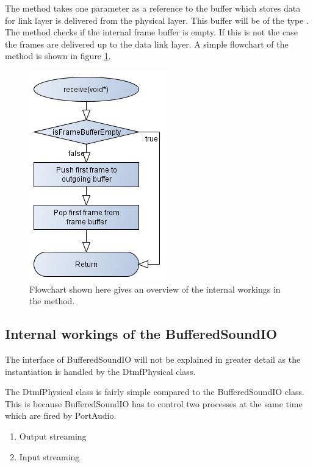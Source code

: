 	The  method takes one parameter as a reference to the buffer which stores data for link layer is delivered from the physical layer.
	This buffer	will be of the type . The  method checks if the internal frame buffer is empty.
	If this is not the case the frames are delivered up to the data link layer. A simple flowchart of the  method is shown in figure \ref{fig:physical_receive}.
	
	\begin{figure}[htb]
		\begin{center}
		\includegraphics[scale=0.7,trim=0 0 0 0]{content/graphics/physical/physical_receive.png}%
		\caption{Flowchart shown here gives an overview of the internal workings in the  method.}
		\label{fig:physical_receive}
		\end{center}
	\end{figure}
	
	\subsection{Internal workings of the BufferedSoundIO}
	The interface of BufferedSoundIO will not be explained in greater detail as the instantiation is handled by the DtmfPhysical class.
	
	The DtmfPhysical class is fairly simple compared to the BufferedSoundIO class. This is because BufferedSoundIO has to control two processes
	at the same time which are fired by PortAudio.
	
	\begin{enumerate}
	\item Output streaming
	\item Input streaming
	\end{enumerate}
	
